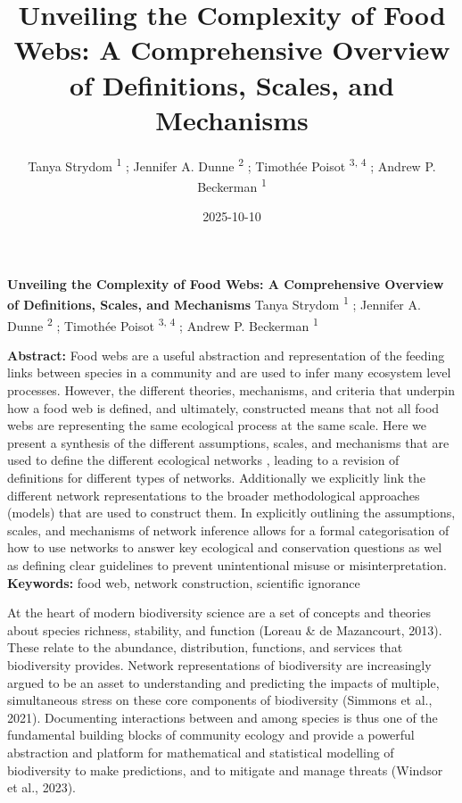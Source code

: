 \documentclass[
]{article}
\title{Unveiling the Complexity of Food Webs: A Comprehensive Overview
of Definitions, Scales, and Mechanisms}
\author{Tanya Strydom %
%
\textsuperscript{%
%
1%
}%
; Jennifer A. Dunne %
%
\textsuperscript{%
%
2%
}%
; Timothée Poisot %
%
\textsuperscript{%
3,%
4%
}%
; Andrew P. Beckerman %
%
\textsuperscript{%
%
1%
}%
}
\date{2025-10-10}
\begin{document}
\thispagestyle{empty}
{\bfseries\sffamily\Large Unveiling the Complexity of Food Webs: A
Comprehensive Overview of Definitions, Scales, and Mechanisms}
\vfil
Tanya Strydom %
%
\textsuperscript{%
%
1%
}%
; Jennifer A. Dunne %
%
\textsuperscript{%
%
2%
}%
; Timothée Poisot %
%
\textsuperscript{%
3,%
4%
}%
; Andrew P. Beckerman %
%
\textsuperscript{%
%
1%
}%

\vfil
{\small
\textbf{Abstract:} Food webs are a useful abstraction and representation
of the feeding links between species in a community and are used to
infer many ecosystem level processes. However, the different theories,
mechanisms, and criteria that underpin how a food web is defined, and
ultimately, constructed means that not all food webs are representing
the same ecological process at the same scale. Here we present a
synthesis of the different assumptions, scales, and mechanisms that are
used to define the different ecological networks , leading to a revision
of definitions for different types of networks. Additionally we
explicitly link the different network representations to the broader
methodological approaches (models) that are used to construct them. In
explicitly outlining the assumptions, scales, and mechanisms of network
inference allows for a formal categorisation of how to use networks to
answer key ecological and conservation questions as wel as defining
clear guidelines to prevent unintentional misuse or misinterpretation.
\vfil
\textbf{Keywords:} %
food web, network construction, %
scientific ignorance%
}
\clearpage
\setcounter{page}{1}
\doublespacing
\linenumbers


At the heart of modern biodiversity science are a set of concepts and
theories about species richness, stability, and function (Loreau \& de
Mazancourt, 2013). These relate to the abundance, distribution,
functions, and services that biodiversity provides. Network
representations of biodiversity are increasingly argued to be an asset
to understanding and predicting the impacts of multiple, simultaneous
stress on these core components of biodiversity (Simmons et al., 2021).
Documenting interactions between and among species is thus one of the
fundamental building blocks of community ecology and provide a powerful
abstraction and platform for mathematical and statistical modelling of
biodiversity to make predictions, and to mitigate and manage threats
(Windsor et al., 2023).
\end{document}
